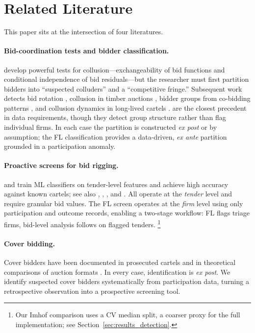\section{Related Literature}
\label{sec:literature}

This paper sits at the intersection of four literatures.

\paragraph{Bid-coordination tests and bidder classification.}
\citet{bajari2003deciding} develop powerful tests for
collusion---exchangeability of bid functions and conditional
independence of bid residuals---but the researcher must first partition
bidders into ``suspected colluders'' and a ``competitive fringe.''
Subsequent work detects bid rotation
\citep{porter1993detection, porter1999ohio}, collusion in timber
auctions \citep{baldwin1997bidder}, bidder groups from co-bidding
patterns \citep{conley2016detecting}, and collusion dynamics in
long-lived cartels \citep{clark2021collusion,
schurter2020identification}. \citet{conley2016detecting} are the
closest precedent in data requirements, though they detect group
structure rather than flag individual firms. In each case the
partition is constructed \emph{ex post} or by assumption; the FL
classification provides a data-driven, \emph{ex ante} partition
grounded in a participation anomaly.

\paragraph{Proactive screens for bid rigging.}
\citet{imhof2019detecting} and \citet{imhof2018screening} train ML
classifiers on tender-level features and achieve high accuracy against
known cartels; see also \citet{abrantesmetz2006a},
\citet{harrington2008detecting}, \citet{chassang2022robust}, and
\citet{wallimann2023machine}. All operate at the \emph{tender} level
and require granular bid values. The FL screen operates at the
\emph{firm} level using only participation and outcome records,
enabling a two-stage workflow: FL flags triage firms, bid-level
analysis follows on flagged tenders.%
\footnote{Our Imhof comparison uses a CV median split, a coarser proxy
for the full implementation; see Section~\ref{sec:results_detection}.}

\paragraph{Cover bidding.}
Cover bidders have been documented in prosecuted cartels
\citep{porter1999ohio, pesendorfer2000study, asker2010leniency,
marshall2012economics} and in theoretical comparisons of auction
formats \citep{athey2011comparing}. In every case, identification is
\emph{ex post}. We identify suspected cover bidders systematically
from participation data, turning a retrospective observation into a
prospective screening tool.


